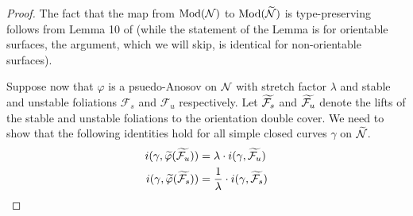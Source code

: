 \begin{proof}
  The fact that the map from $\operatorname{Mod}(\mathcal{N})$ to $\operatorname{Mod}(\widetilde{\mathcal{N}})$ is type-preserving follows from Lemma 10 of \cite{aramayona2009injections} (while the statement of the Lemma is for orientable surfaces, the argument, which we will skip, is identical for non-orientable surfaces).

  Suppose now that $\varphi$ is a psuedo-Anosov on $\mathcal{N}$ with stretch factor $\lambda$ and stable and unstable foliations $\mathcal{F}_s$ and $\mathcal{F}_u$ respectively.
  Let $\widetilde{\mathcal{F}_s}$ and $\widetilde{\mathcal{F}_u}$ denote the lifts of the stable and unstable foliations to the orientation double cover.
  We need to show that the following identities hold for all simple closed curves $\gamma$ on $\widetilde{\mathcal{N}}$.
  \begin{align}
      \label{eq:unstable-foliation}
      i(\gamma, \widetilde{\varphi}(\widetilde{\mathcal{F}_u})) &= \lambda \cdot i(\gamma, \widetilde{\mathcal{F}_u}) \\
      \label{eq:stable-foliation}
      i(\gamma, \widetilde{\varphi}(\widetilde{\mathcal{F}_s})) &= \frac{1}{\lambda} \cdot i(\gamma, \widetilde{\mathcal{F}_s})
  \end{align}


\end{proof}
